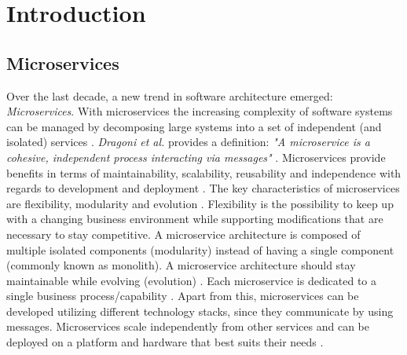 \documentclass{article}
\begin{document}
\pagebreak

\listoftables

\pagebreak

\section{Introduction}
\subsection{Microservices}
Over the last decade, a new trend in software architecture emerged: \textit{Microservices}. With microservices the increasing complexity of software systems can be managed by decomposing large systems into a set of independent (and isolated) services \cite{dragoni_microservices_2017}. \textit{Dragoni et al.} provides a definition: \textit{"A microservice is a cohesive, independent process interacting via messages"} \cite{dragoni_microservices_2017}. Microservices provide benefits in terms of maintainability, scalability, reusability and independence with regards to development and deployment \cite{dragoni_microservices_2017, chen_monolith_2017, al-debagy_comparative_2019}. The key characteristics of microservices are flexibility, modularity and evolution \cite{dragoni_microservices_2017}. Flexibility is the possibility to keep up with a changing business environment while supporting modifications that are necessary to stay competitive. A microservice architecture is composed of multiple isolated components (modularity) instead of having a single component (commonly known as monolith). A microservice architecture should stay maintainable while evolving (evolution) \cite{dragoni_microservices_2017}. Each microservice is dedicated to a single business process/capability \cite{gadea_reference_2016}. Apart from this, microservices can be developed utilizing different technology stacks, since they communicate by using messages. Microservices scale independently from other services and can be deployed on a platform and hardware that best suits their needs \cite{taibi_architectural_2018}.
\end{document}
